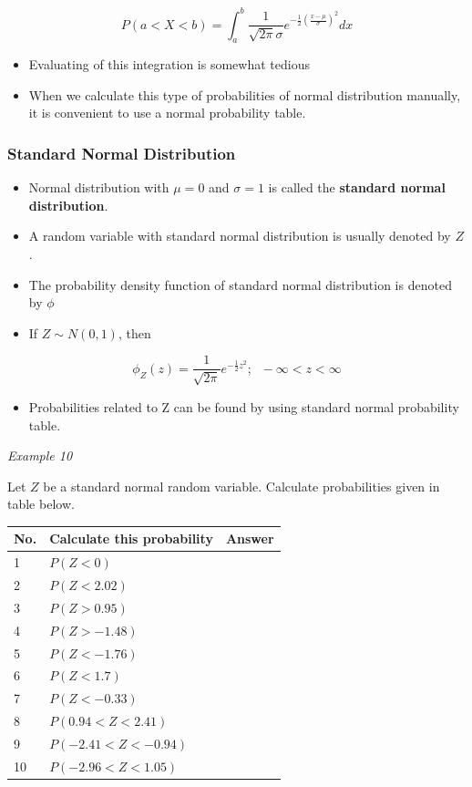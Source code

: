 \documentclass[]{book}
\providecommand{\tightlist}{%
  \setlength{\itemsep}{0pt}\setlength{\parskip}{0pt}}
\begin{document}
\[P(a<X<b)=\int_a^b \frac{1}{\sqrt{2\pi}\sigma}e^{-\frac{1}{2}\left(\frac{x-\mu}{\sigma}\right)^2}dx\]

\begin{itemize}
\tightlist
\item
  Evaluating of this integration is somewhat tedious
\item
  When we calculate this type of probabilities of normal distribution manually, it is convenient to use a normal probability table.
\end{itemize}

\hypertarget{standard-normal-distribution}{%
\subsubsection{Standard Normal Distribution}\label{standard-normal-distribution}}

\begin{itemize}
\tightlist
\item
  Normal distribution with \(\mu =0\) and \(\sigma = 1\) is called the \textbf{standard normal distribution}.
\item
  A random variable with standard normal distribution is usually denoted by \(Z\).
\item
  The probability density function of standard normal distribution is denoted by \(\phi\)
\item
  If \(Z\sim N(0,1)\), then
\end{itemize}

\[\phi_Z(z) = \frac{1}{\sqrt{2 \pi}}e^{-\frac{1}{2}z^2};\;\; -\infty< z< \infty\]

\begin{itemize}
\tightlist
\item
  Probabilities related to Z can be found by using standard normal probability table.
\end{itemize}

\newpage

\emph{Example 10}

Let \(Z\) be a standard normal random variable. Calculate probabilities given in table below.

\begin{longtable}[]{@{}lll@{}}
\toprule
No. & Calculate this probability & Answer\tabularnewline
\midrule
\endhead
1 & \(P(Z < 0)\) &\tabularnewline
2 & \(P(Z < 2.02)\) &\tabularnewline
3 & \(P(Z > 0.95)\) &\tabularnewline
4 & \(P(Z > -1.48)\) &\tabularnewline
5 & \(P(Z < -1.76)\) &\tabularnewline
6 & \(P(Z < 1.7)\) &\tabularnewline
7 & \(P(Z < -0.33)\) &\tabularnewline
8 & \(P(0.94 < Z < 2.41)\) &\tabularnewline
9 & \(P(-2.41 < Z < -0.94)\) &\tabularnewline
10 & \(P(-2.96 < Z < 1.05)\) &\tabularnewline
\bottomrule
\end{longtable}
\end{document}
